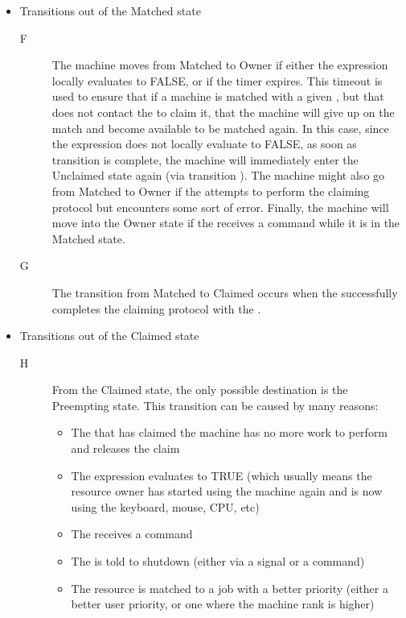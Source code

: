 \begin{itemize}
\begin{description}
\end{description}


\item Transitions out of the Matched state

\begin{description}

\item[F] The machine moves from Matched to Owner if either the
   expression locally evaluates to FALSE, or if the 
   timer expires.
  This timeout is used to ensure that if a machine is matched with a
  given , but that  does not contact the
   to claim it, that the machine will give up on the
  match and become available to be matched again.
  In this case, since the  expression does not locally
  evaluate to FALSE, as soon as transition  is complete, the
  machine will immediately enter the Unclaimed state again (via
  transition ).
  The machine might also go from Matched to Owner if the
   attempts to perform the claiming protocol but
  encounters some sort of error.
  Finally, the machine will move into the Owner state if the
   receives a  command while it is in
  the Matched state.

\item[G] The transition from Matched to Claimed occurs when the
   successfully completes the claiming protocol with
  the .

\end{description}

\item Transitions out of the Claimed state

\begin{description}

\item[H] From the Claimed state, the only possible destination is the
  Preempting state.
  This transition can be caused by many reasons:
  \begin{itemize}
  \item The  that has claimed the machine has no more
    work to perform and releases the claim
  \item The  expression evaluates to TRUE (which usually
    means the resource owner has started using the machine again and
    is now using the keyboard, mouse, CPU, etc)  
  \item The  receives a  command
  \item The  is told to shutdown (either via a signal
    or a  command)
  \item The resource is matched to a job with a better priority
    (either a better user priority, or one where the machine rank is
    higher)
  \end{itemize}


\end{description}
\end{itemize}
